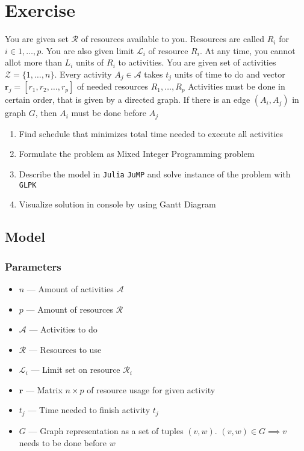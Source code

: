 \section{Exercise}
You are given set $\mathcal{R}$ of resources available to you. Resources are called $R_i$ for $i \in 1,\dots , p$.
You are also given limit $\mathcal{L}_i$ of resource $R_i$. At any time, you cannot allot more than $L_i$ units of $R_i$ to activities.
You are given set of activities $\mathcal{Z} = \{1,\dots ,n\}$. 
Every activity $A_j \in \mathcal{A}$ takes $t_j$ units of time to do and vector $\mathbf{r}_j = [r_1, r_2, \dots, r_p]$ of needed resources $R_1, \dots , R_p$
Activities must be done in certain order, that is given by a directed graph. If there is an edge $(A_i, A_j)$ in graph $G$, then $A_i$ must be done before $A_j$


\begin{enumerate}
    \item Find schedule that minimizes total time needed to execute all activities\notdone
    \item Formulate the problem as Mixed Integer Programming problem\notdone
    \item Describe the model in \texttt{Julia} \texttt{JuMP} and solve instance of the problem with \texttt{GLPK}\notdone
    \item Visualize solution in console by using Gantt Diagram \notdone
\end{enumerate}

\subsection{Model}
\subsubsection*{Parameters}
\begin{itemize}
    \item $n$ --- Amount of activities $\mathcal{A}$
    \item $p$ --- Amount of resources $\mathcal{R}$
    \item $\mathcal{A}$ --- Activities to do
    \item $\mathcal{R}$ --- Resources to use
    \item $\mathcal{L}_i$ --- Limit set on resource $\mathcal{R}_i$
    \item $\mathbf{r}$ --- Matrix $n \times p$ of resource usage for given activity
    \item $t_j$ --- Time needed to finish activity $t_j$
    \item $G$ --- Graph representation as a set of tuples $(v,w)$. $(v,w) \in G \implies v $ needs to be done before $w$  
\end{itemize}
